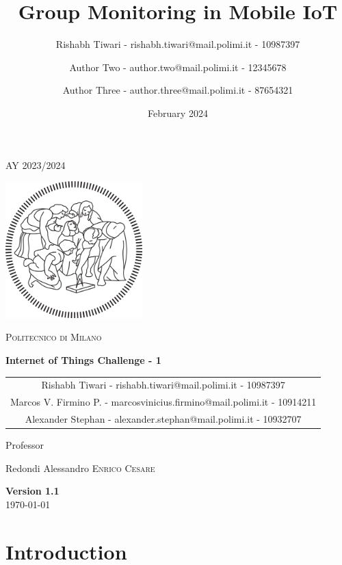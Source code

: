 \documentclass{article}
\title{Group Monitoring in Mobile IoT}
\author{%
Rishabh Tiwari - rishabh.tiwari@mail.polimi.it - 10987397 \and
Author Two - author.two@mail.polimi.it - 12345678 \and
Author Three - author.three@mail.polimi.it - 87654321
}
\date{February 2024}
\begin{document}
\begin{titlepage}
    \centering
    {\scshape\large AY 2023/2024 \par}
    \vfill
    \includegraphics[width=150pt]{Images/PolimiLogo.png}\par\vspace{1cm}
    {\scshape\LARGE Politecnico di Milano \par}
    \vspace{1.5cm}
    {\huge\bfseries Internet of Things Challenge - 1\par}
    \vspace{2cm}
    {\Large \begin{tabular}{c}
    Rishabh Tiwari - rishabh.tiwari@mail.polimi.it - 10987397\\
    Marcos V. Firmino P. - marcosvinicius.firmino@mail.polimi.it
 - 10914211\\
    Alexander Stephan - alexander.stephan@mail.polimi.it - 10932707
    \end{tabular}\par}
    \vfill
    {\large Professor\par
        Redondi Alessandro \textsc{Enrico Cesare}}
    \vfill
    {\large \textbf{Version 1.1}\\ \today \par}
\end{titlepage}
\thispagestyle{plain}
\mbox{}
\tableofcontents
\newpage
{}
\section{Introduction}
\end{document}
